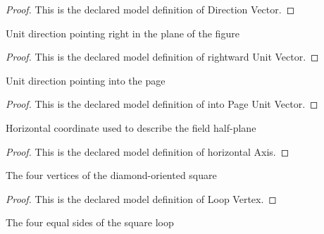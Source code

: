 \begin{proof}
  This is the declared model definition of Direction Vector.
\end{proof}
\begin{definition}
  \label{def:physics:phyx-mini-0931:phyxminiproblems-problemphyxmini0931-rightwardunitvector}
  Unit direction pointing right in the plane of the figure
\end{definition}
\begin{proof}
  This is the declared model definition of rightward Unit Vector.
\end{proof}
\begin{definition}
  \label{def:physics:phyx-mini-0931:phyxminiproblems-problemphyxmini0931-intopageunitvector}
  Unit direction pointing into the page
\end{definition}
\begin{proof}
  This is the declared model definition of into Page Unit Vector.
\end{proof}
\begin{definition}
  \label{def:physics:phyx-mini-0931:phyxminiproblems-problemphyxmini0931-horizontalaxis}
  Horizontal coordinate used to describe the field half-plane
\end{definition}
\begin{proof}
  This is the declared model definition of horizontal Axis.
\end{proof}
\begin{definition}
  \label{def:physics:phyx-mini-0931:phyxminiproblems-problemphyxmini0931-loopvertex}
  The four vertices of the diamond-oriented square
\end{definition}
\begin{proof}
  This is the declared model definition of Loop Vertex.
\end{proof}
\begin{definition}
  \label{def:physics:phyx-mini-0931:phyxminiproblems-problemphyxmini0931-loopside}
  The four equal sides of the square loop
\end{definition}
